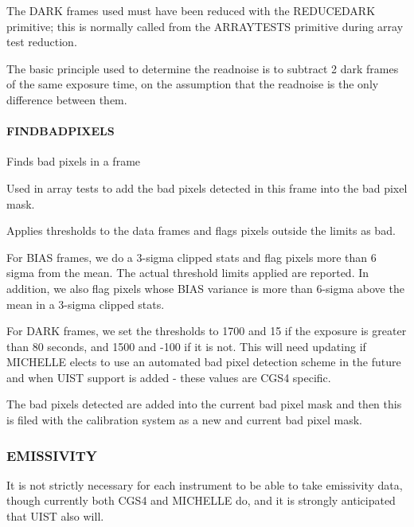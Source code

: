 \documentclass[twoside,11pt]{article}
\renewcommand{\_}{\texttt{\symbol{95}}}
\begin{document}
The DARK frames used must have been reduced with the \_REDUCE\_DARK\_
primitive; this is normally called from the \_ARRAY\_TESTS\_ primitive
during array test reduction.



The basic principle used to determine the readnoise is to subtract 2
dark frames of the same exposure time, on the assumption that the
readnoise is the only difference between them.


\paragraph{\_FIND\_BAD\_PIXELS\_\label{_FIND_BAD_PIXELS_}}


Finds bad pixels in a frame


\mbox{}


Used in array tests to add the bad pixels detected in this frame into the 
bad pixel mask.



Applies thresholds to the data frames and flags pixels outside
the limits as bad.



For BIAS frames, we do a 3-sigma clipped stats and flag pixels more
than 6 sigma from the mean. The actual threshold limits applied are
reported. In addition, we also flag pixels whose BIAS variance is more
than 6-sigma above the mean in a 3-sigma clipped stats.



For DARK frames, we set the thresholds to 1700 and 15 if the exposure
is greater than 80 seconds, and 1500 and -100 if it is not. This will
need updating if MICHELLE elects to use an automated bad pixel
detection scheme in the future and when UIST support is added - these
values are CGS4 specific.



The bad pixels detected are added into the current bad pixel mask and
then this is filed with the calibration system as a new and current
bad pixel mask.


\subsubsection{EMISSIVITY}

It is not strictly necessary for each instrument to be able to take
emissivity data, though currently both CGS4 and MICHELLE do, and it is
strongly anticipated that UIST also will.
\end{document}
